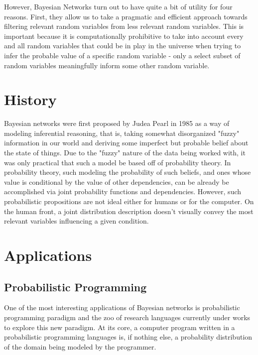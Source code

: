\documentclass[a4paper,12pt]{article}
\begin{document}
However, Bayesian Networks turn out to have quite a bit of utility for four reasons\cite{Heckerman08}. First, they allow us to take a pragmatic and efficient approach towards filtering relevant random variables from less relevant random variables. This is important because it is computationally prohibitive to take into account every and all random variables that could be in play in the universe when trying to infer the probable value of a specific random variable - only a select subset of random variables meaningfully inform some other random variable.

\section{History}

Bayesian networks were first proposed by Judea Pearl\cite{pearl85} in 1985 as a way of modeling inferential reasoning, that is, taking somewhat disorganized "fuzzy" information in our world and deriving some imperfect but probable belief about the state of things. Due to the "fuzzy" nature of the data being worked with, it was only practical that such a model be based off of probability theory. In probability theory, such modeling the probability of such beliefs, and ones whose value is conditional by the value of other dependencies, can be already be accomplished via joint probability functions and dependencies. However, such probabilistic propositions are not ideal either for humans or for the computer. On the human front, a joint distribution description doesn't visually convey the most relevant variables influencing a given condition. 

\cite{murphy02}

\section{Applications}

\subsection{Probabilistic Programming}
One of the most interesting applications of Bayesian networks is probabilistic programming paradigm and the zoo of research languages currently under works to explore this new paradigm. At its core, a computer program written in a probabilistic programming languages is, if nothing else, a probability distribution of the domain being modeled by the programmer. 





\end{document}
